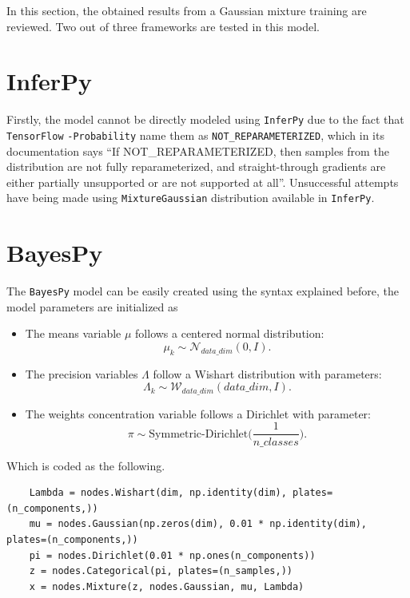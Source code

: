 
In this section, the obtained results from a Gaussian mixture training are reviewed. Two out of three frameworks are tested in this model.

\section{InferPy}

Firstly, the model cannot be directly modeled using \texttt{InferPy} due to the fact that \texttt{TensorFlow} \texttt{-Probability} name them as \texttt{NOT\_REPARAMETERIZED}, which in its documentation says ``If NOT\_REPARAMETERIZED, then samples from the distribution are not fully reparameterized, and straight-through gradients are either partially unsupported or are not supported at all''. Unsuccessful attempts have being made using \texttt{MixtureGaussian} distribution available in \texttt{InferPy}.


\section{BayesPy}

The \texttt{BayesPy} model can be easily created using the syntax explained before, the model parameters are initialized as
\begin{itemize}
  \item The means variable $\mu$ follows a centered normal distribution:
  $$\mu_k \sim \mathcal{N}_{data\_dim}(0,I).$$
  \item The precision variables $\Lambda$ follow a Wishart distribution with parameters:
  $$\Lambda_k \sim \mathcal{W}_{data\_dim}(data\_dim, I).$$
  \item The weights concentration variable follows a Dirichlet with parameter:
  $$ \pi \sim \text{Symmetric-Dirichlet}\Big(\frac{1}{n\_classes}\Big).$$
\end{itemize}

Which is coded as the following.
\begin{verbatim}
    Lambda = nodes.Wishart(dim, np.identity(dim), plates=(n_components,))
    mu = nodes.Gaussian(np.zeros(dim), 0.01 * np.identity(dim), plates=(n_components,))
    pi = nodes.Dirichlet(0.01 * np.ones(n_components))
    z = nodes.Categorical(pi, plates=(n_samples,))
    x = nodes.Mixture(z, nodes.Gaussian, mu, Lambda)
\end{verbatim}

